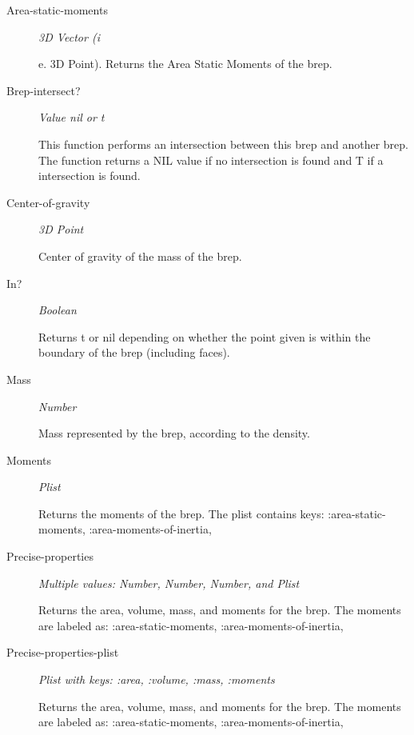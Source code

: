 \documentclass [11pt]{book}
\begin{document}
\begin{itemize}
\begin{description}
\item [Area-static-moments]
\emph{3D Vector (i}

e. 3D Point). Returns the Area Static Moments of the brep.




\item [Brep-intersect?]
\emph{Value nil or t}

 This function performs an intersection between this brep and another brep.
The function returns a NIL value if no intersection is found and T if a intersection is found.




\item [Center-of-gravity]
\emph{3D Point}

 Center of gravity of the mass of the brep.




\item [In?]
\emph{Boolean}

 Returns t or nil depending on whether the point given is within the boundary of the brep (including faces).




\item [Mass]
\emph{Number}

 Mass represented by the brep, according to the density.




\item [Moments]
\emph{Plist}

 Returns the moments of the brep. The plist contains keys: :area-static-moments, :area-moments-of-inertia,




\item [Precise-properties]
\emph{Multiple values: Number, Number, Number, and Plist}

 Returns the area, volume, mass,
and moments for the brep. The moments are labeled as: :area-static-moments, :area-moments-of-inertia,




\item [Precise-properties-plist]
\emph{Plist with keys: :area, :volume, :mass, :moments}

 Returns the area, volume, mass,
and moments for the brep. The moments are labeled as: :area-static-moments, :area-moments-of-inertia,





\end{description}
\end{itemize}
\end{document}
